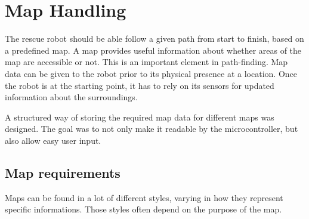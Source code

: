 





\chapter{Map Handling}
\label{ch:map} %
The rescue robot should be able follow a given path from start to finish, based on a predefined map.
A map provides useful information about whether areas of the map are accessible or not. This is an important element in path-finding.
Map data can be given to the robot prior to its physical presence at a location. Once the robot is at the starting point, it has to rely on its sensors for updated information about the surroundings.

A structured way of storing the required map data for different maps was designed. 
The goal was to not only make it readable by the microcontroller,
but also allow easy user input.


\newpage
\section{Map requirements}
\label{ch:map_requirements}
Maps can be found in a lot of different styles,
varying in how they represent specific informations.
Those styles often depend on the purpose of the map.

